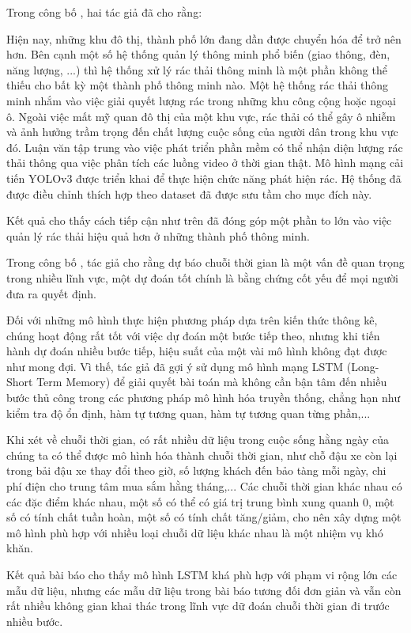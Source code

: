 Trong công bố  \cite{smartcity}, hai tác giả đã cho rằng:

Hiện nay, những khu đô thị, thành phố lớn đang dần được chuyển hóa để trở nên  hơn. Bên cạnh một số hệ thống quản lý thông minh phổ biến (giao thông, đèn, năng lượng, ...) thì hệ thống xử lý rác thải thông minh là một phần không thể thiếu cho bất kỳ một thành phố thông minh nào. 
Một hệ thống rác thải thông minh nhắm vào việc giải quyết lượng rác trong những khu công cộng hoặc ngoại ô. Ngoài việc mất mỹ quan đô thị của một khu vực, rác thải có thể gây ô nhiễm và ảnh hưởng trầm trọng đến chất lượng cuộc sống của người dân trong khu vực đó. Luận văn tập trung vào việc phát triển phần mềm có thể nhận diện lượng rác thải thông qua việc phân tích các luồng video ở thời gian thật. Mô hình mạng cải tiến YOLOv3 được triển khai để thực hiện chức năng phát hiện rác. Hệ thống đã được điều chỉnh thích hợp theo dataset đã được sưu tầm cho mục đích này.  

Kết quả cho thấy cách tiếp cận như trên đã đóng góp một phần to lớn vào việc quản lý rác thải hiệu quả hơn ở những thành phố thông minh.

Trong công bố \cite{lstmprediction1}, tác giả cho rằng dự báo chuỗi thời gian là một vấn đề quan trọng trong nhiều lĩnh vực, một dự đoán tốt chính là bằng chứng cốt yếu để mọi người đưa ra quyết định.

Đối với những mô hình thực hiện phương pháp dựa trên kiến thức thông kê, chúng hoạt động rất tốt với việc dự đoán một bước tiếp theo, nhưng khi tiến hành dự đoán nhiều bước tiếp, hiệu suất của một vài mô hình không đạt được như mong đợi. Vì thế, tác giả đã gợi ý sử dụng mô hình mạng LSTM (Long-Short Term Memory) để giải quyết bài toán mà không cần bận tâm đến nhiều bước thủ công trong các phương pháp mô hình hóa truyền thống, chẳng hạn như kiểm tra độ ổn định, hàm tự tương quan, hàm tự tương quan từng phần,...

Khi xét về chuỗi thời gian, có rất nhiều dữ liệu trong cuộc sống hằng ngày của chúng ta có thể được mô hình hóa thành chuỗi thời gian, như chỗ đậu xe còn lại trong bải đậu xe thay đổi theo giờ, số lượng khách đến bảo tàng mỗi ngày, chi phí điện cho trung tâm mua sắm hằng tháng,... Các chuỗi thời gian khác nhau có các đặc điểm khác nhau, một số có thể có giá trị trung bình xung quanh 0, một số có tính chất tuần hoàn, một số có tính chất tăng/giảm, cho nên xây dựng một mô hình phù hợp với nhiều loại chuỗi dữ liệu khác nhau là một nhiệm vụ khó khăn.

Kết quả bài báo cho thấy mô hình LSTM khá phù hợp với phạm vi rộng lớn các mẫu dữ liệu, nhưng các mẫu dữ liệu trong bài báo tương đối đơn giản và vẫn còn rất nhiều không gian khai thác trong lĩnh vực dữ đoán chuỗi thời gian đi trước nhiều bước.

